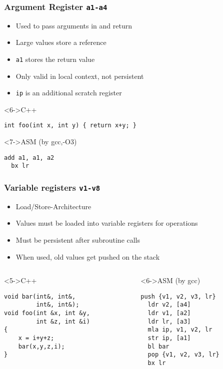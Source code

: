 \documentclass{beamer}
\begin{document}
\begin{frame}[fragile]
\frametitle{Argument Register \lstinline{a1-a4}}
\begin{itemize}
\item<1-> Used to pass arguments in and return
\item<2-> Large values store a reference
\item<3-> \lstinline{a1} stores the return value
\item<4-> Only valid in local context, not persistent
\item<5-> \lstinline{ip} is an additional scratch register
\end{itemize}

\begin{block}<6->{C++}
\begin{lstlisting}
int foo(int x, int y) { return x+y; }
\end{lstlisting}
\end{block}

\begin{block}<7->{ASM (by gcc,-O3)}
\begin{lstlisting}[language=ASM]
  add a1, a1, a2
  bx lr
\end{lstlisting}
\end{block}

\end{frame}

\begin{frame}[fragile]
\frametitle{Variable registers \lstinline{v1-v8}}
\begin{itemize}
\item<1-> Load/Store-Architecture
\item<2-> Values must be loaded into variable registers for operations
\item<3-> Must be persistent after subroutine calls
\item<4-> When used, old values get pushed on the stack
\end{itemize}

\begin{columns}
\begin{column}{0.55\textwidth}
\begin{block}<5->{C++}
\begin{lstlisting}[basicstyle=\small]
void bar(int&, int&, 
         int&, int&);
void foo(int &x, int &y, 
         int &z, int &i)
{ 
    x = i+y+z; 
    bar(x,y,z,i); 
}\end{lstlisting}
\end{block}
\end{column}
\begin{column}{0.45\textwidth}
\begin{block}<6->{ASM (by gcc)}
\begin{lstlisting}[language=ASM,basicstyle=\small]
  push {v1, v2, v3, lr}
  ldr v2, [a4]
  ldr v1, [a2]
  ldr lr, [a3]
  mla ip, v1, v2, lr
  str ip, [a1]
  bl bar
  pop {v1, v2, v3, lr}
  bx lr
\end{lstlisting}
\end{block}
\end{column}
\end{columns}

\end{frame}
\end{document}

